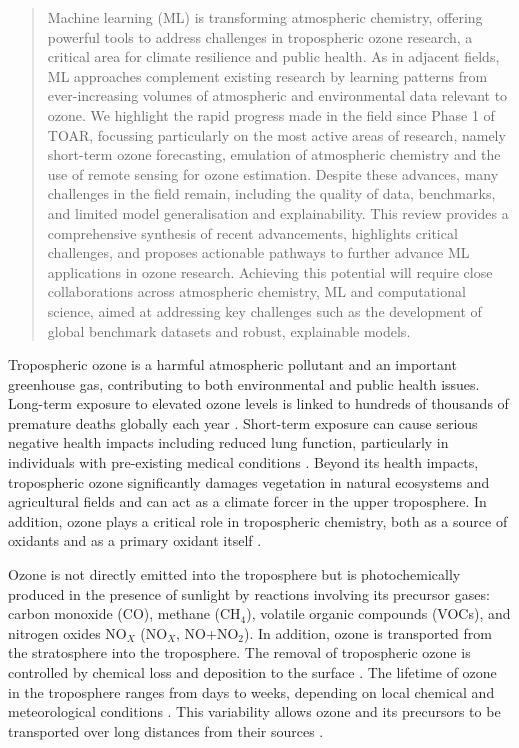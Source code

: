 \documentclass[gmd, manuscript]{copernicus}
\begin{document}
\begin{abstract}

Machine learning (ML) is transforming atmospheric chemistry, offering powerful tools to address challenges in tropospheric ozone research, a critical area for climate resilience and public health. As in adjacent fields, ML approaches complement existing research by learning patterns from ever-increasing volumes of atmospheric and environmental data relevant to ozone. We highlight the rapid progress made in the field since Phase 1 of TOAR, focussing particularly on the most active areas of research, namely short-term ozone forecasting, emulation of atmospheric chemistry and the use of remote sensing for ozone estimation. Despite these advances, many challenges in the field remain, including the quality of data, benchmarks, and limited model generalisation and explainability. This review provides a comprehensive synthesis of recent advancements, highlights critical challenges, and proposes actionable pathways to further advance ML applications in ozone research. Achieving this potential will require close collaborations across atmospheric chemistry, ML and computational science, aimed at addressing key challenges such as the development of global benchmark datasets and robust, explainable models.

\end{abstract}

\introduction  %
Tropospheric ozone is a harmful atmospheric pollutant and an important greenhouse gas, contributing to both environmental and public health issues. Long-term exposure to elevated ozone levels is linked to hundreds of thousands of premature deaths globally each year \citep{malashock_global_2022, malley_updated_2017, health_effects_institute_state_2024}. Short-term exposure can cause serious negative health impacts \citep{bell_who_2014} including reduced lung function, particularly in individuals with pre-existing medical conditions \citep{us2020integrated}. Beyond its health impacts, tropospheric ozone significantly damages vegetation in natural ecosystems and agricultural fields \citep{mills_ozone_2018} and can act as a climate forcer in the upper troposphere. In addition, ozone plays a critical role in tropospheric chemistry, both as a source of oxidants and as a primary oxidant itself \citep{monks_tropospheric_2015}.

Ozone is not directly emitted into the troposphere but is photochemically produced in the presence of sunlight by reactions involving its precursor gases: carbon monoxide (CO), methane (CH$_4$), volatile organic compounds (VOCs), and nitrogen oxides NO$_X$ (NO$_X$, NO+NO$_2$). In addition, ozone is transported from the stratosphere into the troposphere. The removal of tropospheric ozone is controlled by chemical loss and deposition to the surface \citep{archibald_tropospheric_2020}. The lifetime of ozone in the troposphere ranges from days to weeks, depending on local chemical and meteorological conditions \citep{lelieveld_what_2000, monks_tropospheric_2015}. This variability allows ozone and its precursors to be transported over long distances from their sources \citep{fiore_multimodel_2009}.
\end{document}
